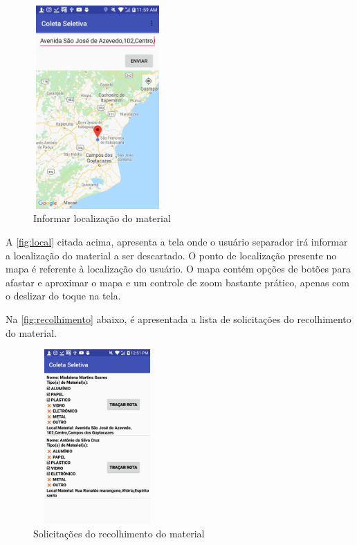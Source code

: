 \begin{figure}[H]
	\begin{Center}
		\includegraphics[width=1.93in,height=3.06in]{./media/image49.png}
	\end{Center}
	\caption{Informar localização do material}
	\label{fig:local}
\end{figure}

A \autoref{fig:local} citada acima, apresenta a tela onde o usuário separador irá informar a localização do material a ser descartado. O ponto de localização presente no mapa é referente à localização do usuário. O mapa contém opções de botões para afastar e aproximar o mapa e um controle de zoom bastante prático, apenas com o deslizar do toque na tela.

Na \autoref{fig:recolhimento} abaixo, é apresentada a lista de solicitações do recolhimento do material.

\begin{figure}[H]
	\begin{Center}
		\includegraphics[width=1.93in,height=2.63in]{./media/image52.png}
	\end{Center}
	\caption{Solicitações do recolhimento do material}
	\label{fig:recolhimento}
\end{figure}

